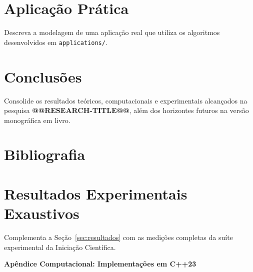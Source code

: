 \documentclass[12pt,a4paper]{article}
\newcommand{\code}[1]{\lstinline{#1}}
\begin{document}
\section{Aplicação Prática}\label{sec:aplicacao}

Descreva a modelagem de uma aplicação real que utiliza os algoritmos desenvolvidos em \code{applications/}.

\section{Conclusões}\label{sec:conclusoes}

Consolide os resultados teóricos, computacionais e experimentais alcançados na pesquisa \textbf{@@RESEARCH-TITLE@@}, além dos horizontes futuros na versão monográfica em livro.

\newpage

\section{Bibliografia}



\newpage

\appendix
\renewcommand{\theHsection}{apendice.\arabic{section}}
\providecommand{\apendice}[1]{\section{#1}}

\apendice{Resultados Experimentais Exaustivos}
\label{ap:benchmarks_completos}

Complementa a Seção~\ref{sec:resultados} com as medições completas da suíte experimental da Iniciação Científica.

\newpage

\begin{center}{\Large\textbf{Apêndice Computacional: Implementações em C++23}}\end{center}
\end{document}
